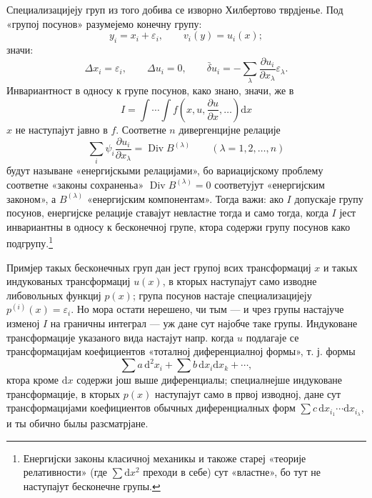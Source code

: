 ﻿\documentclass[11pt]{article}
\providecommand{\eps}{\varepsilon}
\providecommand{\D}{\Delta}
\providecommand{\p}{\partial}
\providecommand{\dd}{\mathrm d}
\DeclareMathOperator{\Div}{Div}
\providecommand{\bd}{\bar{\delta}}
\begin{document}
Специализацијеју груп из того добива се изворно Хилбертово тврдјенье. Под «групој посунов» разумејемо конечну групу:
\[
y_i=x_i+\eps_i,\qquad v_i(y)=u_i(x);
\]
значи:
\[
\D x_i=\eps_i,\qquad \D u_i=0,\qquad
\bd u_i=-\sum_\lambda\frac{\p u_i}{\p x_\lambda}\eps_\lambda.
\]
Инвариантност в односу к групе посунов, како знано, значи, же в
\[
I=\int\!\cdots\!\int f\!\left(x,u,\frac{\p u}{\p x},\ldots\right)\dd x
\]
\(x\) не наступајут јавно в \(f\). Соответне \(n\) дивергенцијне релације
\[
\sum_i\psi_i\frac{\p u_i}{\p x_\lambda}=\Div B^{(\lambda)}
\qquad(\lambda=1,2,\ldots,n)
\]
будут называне «енергијскыми релацијами», бо вариацијскому проблему соответне «законы сохраненьа» \(\Div B^{(\lambda)}=0\) соответујут «енергијским законом», а \(B^{(\lambda)}\) «енергијским компонентам». Тогда важи: ако \(I\) допускаје групу посунов, енергијске релације ставајут невластне тогда и само тогда, когда \(I\) јест инвариантны в односу к бесконечној групе, ктора содержи групу посунов како подгрупу.\footnote{Енергијски законы класичној механикы и такоже стареј «теорије релативности» (где \(\sum \dd x^2\) преходи в себе) сут «властне», бо тут не наступајут бесконечне групы.}

Примјер такых бесконечных груп дан јест групој всих трансформациј \(x\) и такых индукованых трансформациј \(u(x)\), в кторых наступајут само изводне либовольных функциј \(p(x)\); група посунов настаје специализацијеју \(p^{(i)}(x)=\eps_i\). Но мора остати нерешено, чи тым --- и чрез групы настајуче изменој \(I\) на граничны интеграл --- уж дане сут најобче таке групы. Индуковане трансформације указаного вида настајут напр. когда \(u\) подлагаје се трансформацијам коефициентов «тоталној диференциалној формы», т. ј. формы
\[
\sum a\,\dd^2x_i+\sum b\,\dd x_i\dd x_k+\cdots,
\]
ктора кроме \(\dd x\) содержи још выше диференциалы; специалнејше индуковане трансформације, в кторых \(p(x)\) наступајут само в првој изводној, дане сут трансформацијами коефициентов обычных диференциалных форм \(\sum c\,\dd x_{i_1}\cdots \dd x_{i_\lambda}\), и ты обично былы разсматрјане.
\end{document}
